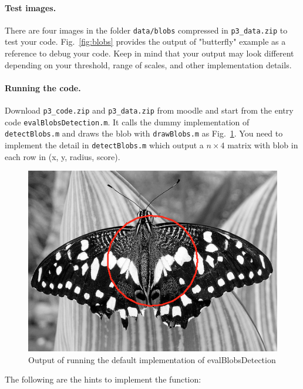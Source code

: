 \documentclass[10pt,letterpaper]{article}
\newcommand{\cmd}[1] {{\color{blue}\texttt{#1}}}
\begin{document}
\paragraph{Test images.} There are four images in the folder \cmd{data/blobs} compressed in \cmd{p3\_data.zip} to test your code. Fig.~\ref{fig:blobs} provides the output of "butterfly" example as a reference to debug your code. Keep in mind that your output may look different depending on your threshold, range of scales, and other implementation details.

\paragraph{Running the code.} Download \cmd{p3\_code.zip} and  \cmd{p3\_data.zip} from moodle and start from the entry code \cmd{evalBlobsDetection.m}. It calls the dummy implementation of \cmd{detectBlobs.m} and draws the blob with \cmd{drawBlobs.m} as Fig.~\ref{fig:dummy}. You need to implement the detail in \cmd{detectBlobs.m} which output a $n \times 4$ matrix with blob in each row in (x, y, radius, score). 

\begin{figure}[h]
\centering
\includegraphics[width=0.3\linewidth]{./fig/butterfly-dummy.png} 
\caption{\label{fig:dummy} Output of running the default implementation of evalBlobsDetection}
\end{figure}

The following are the hints to implement the function:
\end{document}
